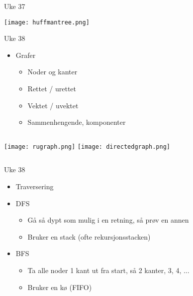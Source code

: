 \documentclass[norsk]{beamer}
\begin{document}
	\begin{frame}{Uke 37}
		\begin{center}
			\texttt{[image: huffmantree.png]}
		\end{center}
	\end{frame}

	\begin{frame}{Uke 38}
		\begin{itemize}
			\item Grafer
				\begin{itemize}
					\item Noder og kanter
					\item Rettet / urettet
					\item Vektet / uvektet
					\item Sammenhengende, komponenter
				\end{itemize}
		\end{itemize}
			\begin{center}
				\begin{columns}
				\texttt{[image: rugraph.png]}
				\texttt{[image: directedgraph.png]}
			\end{columns}
		\end{center}
	\end{frame}

	\begin{frame}{Uke 38}
		\begin{itemize}
			\item Traversering
			\item DFS
				\begin{itemize}
					\item Gå så dypt som mulig i en retning, så prøv en annen
					\item Bruker en stack (ofte rekursjonsstacken)
				\end{itemize}
			\item BFS
				\begin{itemize}
					\item Ta alle noder 1 kant ut fra start, så 2 kanter, 3, 4, ...
					\item Bruker en kø (FIFO)
				\end{itemize}
		\end{itemize}
	\end{frame}
\end{document}
